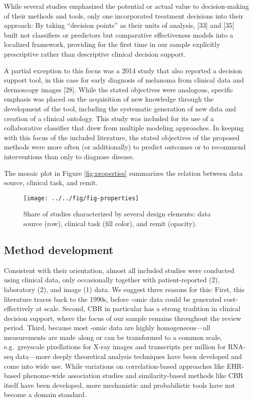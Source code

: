 \documentclass[preprint, 3p,
authoryear]{elsarticle} %
\begin{document}
While several studies emphasized the potential or actual value to
decision-making of their methods and tools, only one incorporated
treatment decisions into their approach: By taking ``decision points''
as their units of analysis, {[}33{]} and {[}35{]} built not classifiers
or predictors but comparative effectiveness models into a localized
framework, providing for the first time in our sample explicitly
prescriptive rather than descriptive clinical decision support.

A partial exception to this focus was a 2014 study that also reported a
decision support tool, in this case for early diagnosis of melanoma from
clinical data and dermoscopy images {[}28{]}. While the stated
objectives were analogous, specific emphasis was placed on the
acquisition of new knowledge through the development of the tool,
including the systematic generation of new data and creation of a
clinical ontology. This study was included for its use of a
collaborative classifier that drew from multiple modeling approaches. In
keeping with this focus of the included literature, the stated
objectives of the proposed methods were more often (or additionally) to
predict outcomes or to recommend interventions than only to diagnose
disease.

The mosaic plot in Figure \ref{fig:properties} summarizes the relation
between data source, clinical task, and remit.

\begin{figure}

{\centering \texttt{[image: ../../fig/fig-properties]} 

}

\caption{\label{fig:properties}Share of studies characterized by several design elements: data source (row), clinical task (fill color), and remit (opacity).}\label{fig:fig:properties}
\end{figure}

\hypertarget{method-development}{%
\subsection{Method development}\label{method-development}}

Consistent with their orientation, almost all included studies were
conducted using clinical data, only occasionally together with
patient-reported (2), laboratory (2), and image (1) data. We suggest
three reasons for this: First, this literature traces back to the 1990s,
before -omic data could be generated cost-effectively at scale. Second,
CBR in particular has a strong tradition in clinical decision support,
where the focus of our sample remains throughout the review period.
Third, because most -omic data are highly homogeneous---all measurements
are made along or can be transformed to a common scale, e.g.~greyscale
pixellations for X-ray images and transcripts per million for RNA-seq
data---more deeply theoretical analysis techniques have been developed
and come into wide use. While variations on correlation-based approaches
like EHR-based phenome-wide association studies and similarity-based
methods like CBR itself have been developed, more mechanistic and
probabilistic tools have not become a domain standard.
\end{document}
